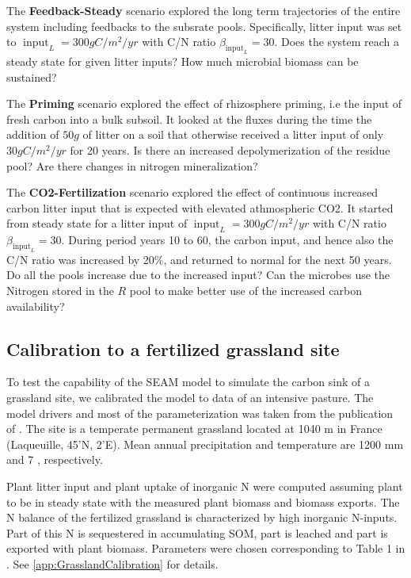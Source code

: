 The \textbf{Feedback-Steady} scenario explored the long term trajectories of
the entire system including feedbacks to the subsrate pools. Specifically, litter
input was set to $\operatorname{input}_L = 300 gC/m^2/yr$ with C/N ratio
$\beta_{\operatorname{input}_L} = 30$. Does the system reach a steady state for
given litter inputs? How much microbial biomass can be sustained?

The \textbf{Priming} scenario explored the effect of rhizosphere priming, i.e
the input of fresh carbon into a bulk subsoil. It looked at the fluxes during
the time the addition of $50 g$ of litter on a soil that otherwise
received a litter input of only $30 gC/m^2/yr$ for 20 years. Is
there an increased depolymerization of the residue pool? Are there changes in nitrogen
mineralization?

The \textbf{CO2-Fertilization} scenario explored the effect of continuous 
increased carbon litter input that is expected with elevated athmospheric CO2.
It started from steady state for a litter input of $\operatorname{input}_L = 300
gC/m^2/yr$ with C/N ratio $\beta_{\operatorname{input}_L} = 30$. During period
years 10 to 60, the carbon input, and hence also the C/N ratio was increased by
20\%, and returned to normal for the next 50 years. Do all the pools increase
due to the increased input? Can the microbes use the Nitrogen stored in the $R$
pool to make better use of the increased carbon availability?

\subsection{Calibration to a fertilized grassland site} 

To test the capability of the SEAM model to simulate the carbon sink of a
grassland site, we calibrated the model to data of an intensive pasture. The
model drivers and most of the parameterization was taken from the publication of
\citep{Perveen14}. The site is a temperate permanent grassland
located at 1040 m in France (Laqueuille, 45'N,
2'E). Mean annual precipitation and temperature are 1200 mm and 7
, respectively. 

Plant litter input and plant uptake of inorganic N were
computed assuming plant to be in steady state with the measured plant biomass and
biomass exports. The N balance of the fertilized grassland is characterized by
high inorganic N-inputs. Part of this N is sequestered in accumulating SOM, part
is leached and part is exported with plant biomass. Parameters were chosen
corresponding to Table 1 in \citep{Perveen14}. See
\ref{app:GrasslandCalibration} for details.

